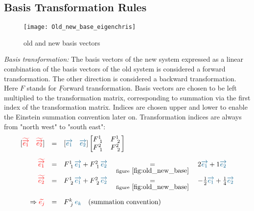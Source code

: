 \subsection{Basis Transformation Rules}

\begin{figure}[h]
    \centering
    \texttt{[image: Old\_new\_base\_eigenchris]}
    \caption{old and new basis vectors}
    \label{fig:old_new_base}
\end{figure}

\emph{Basis transformation:} The basis vectors of the new system expressed as a linear
combination of the basis vectors of the old system is considered a forward transformation.
The other direction is considered a backward transformation.\\

Here $F$ stands for $\underline{F}$orward transformation. Basis vectors are chosen to be
left multiplied to the transformation matrix, corresponding to summation via the first
index of the transformation matrix. Indices are chosen upper and lower to enable the
Einstein summation convention later on. Transformation indices are always from "north
west" to "south east":
\begin{equation}
    \label{eq:forward_trafo}
    \begin{array}{rcl}
        [\hdbtv{1} \quad \hdbtv{2}] & = &
        [\hdbv{1} \quad \hdbv{2}]
        \begin{bmatrix}
            F^{1~}_{~1} & F^{1~}_{~2} \\
            F^{2~}_{~1} & F^{2~}_{~2}
        \end{bmatrix} \\
        \noalign{\vskip10pt}
        \hdbtv{1} & = & F^{1~}_{~1}\hdbv{1} + F^{2~}_{~1}\hdbv{2}
        \quad \underset{\text{figure}~\ref{fig:old_new_base}}{=} \quad
        2 \hdbv{1} + 1 \hdbv{2} \\
        \hdbtv{2} & = & F^{1~}_{~2}\hdbv{1} + F^{2~}_{~2}\hdbv{2}
        \quad \underset{\text{figure}~\ref{fig:old_new_base}}{=} \quad
        -\frac{1}{2}\hdbv{1} + \frac{1}{4}\hdbv{2} \\
        \noalign{\vskip10pt}
        \Rightarrow \hdbtvc{j} & = &
        F^{k~}_{~j} \hdbvc{k} \quad\text{(summation convention)}
    \end{array}
\end{equation}

